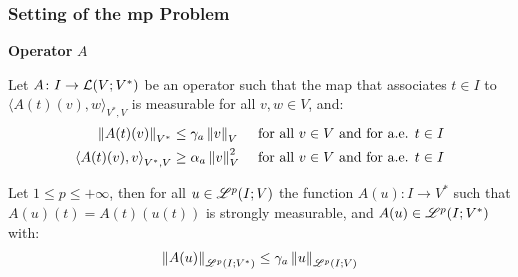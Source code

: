 \begin{frame}
    \frametitle{Setting of the \acrfull{mp} Problem}

    \vspace*{\fill}
    \begin{center}
        {\color{\accentcolor} \Large \textbf{Operator} $A$}
        \vspace*{0.25cm}

        \begin{minipage}{0.75\textwidth}
            \begin{definition}
                Let $A \colon I \rightarrow \mathcal{L}(V;V^*)$ be an operator such that the map that associates $t \in I$ to $\langle A(t)(v), w \rangle_{V^*, V}$ is measurable for all $v, w \in V$, and:
                \begin{align*}
                    \left\lVert A(t)(v) \right\rVert_{V^*} & \leq \gamma_{a} \left\lVert v \right\rVert_V &\text{ for all } v \in V \text{ and for a.e. } t \in I \\
                    \left\langle A(t)(v), v \right\rangle_{V^*, V} & \geq \alpha_{a} \left\lVert v \right\rVert_V^2 &\text{ for all } v \in V \text{ and for a.e. } t \in I
                \end{align*}
            \end{definition}

            \begin{lemma}
                Let $1 \leq p \leq +\infty$, then for all $u \in \mathscr{L}^{p}(I; V)$ the function $A(u) \colon I \rightarrow V^*$ such that $A(u)(t) = A(t)(u(t))$ is strongly measurable, and $A(u) \in \mathscr{L}^{p}(I; V^*)$ with:
                \begin{align*}
                    \left\lVert A(u) \right\rVert_{\mathscr{L}^{p}(I; V^*)} \leq \gamma_{a} \left\lVert u \right\rVert_{\mathscr{L}^{p}(I; V)}
                \end{align*}
            \end{lemma}
        \end{minipage}
    \end{center}
    \vspace*{\fill}
    
\end{frame}

